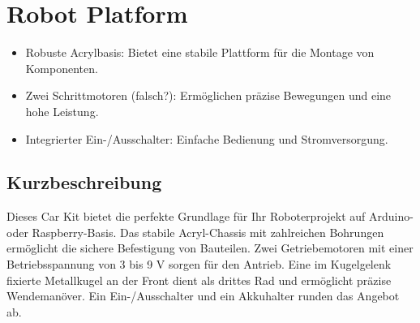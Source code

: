 %
%
%

\chapter{Robot Platform}









\begin{itemize}
    \item Robuste Acrylbasis: Bietet eine stabile Plattform für die Montage von Komponenten.
    \item Zwei Schrittmotoren (falsch?): Ermöglichen präzise Bewegungen und eine hohe Leistung.
    \item Integrierter Ein-/Ausschalter: Einfache Bedienung und Stromversorgung.
\end{itemize}


 \section{Kurzbeschreibung}
 
 Dieses Car Kit bietet die perfekte Grundlage für Ihr Roboterprojekt auf Arduino- oder Raspberry-Basis. Das stabile Acryl-Chassis mit zahlreichen Bohrungen ermöglicht die sichere Befestigung von Bauteilen. Zwei Getriebemotoren mit einer Betriebsspannung von 3 bis 9 V sorgen für den Antrieb. Eine im Kugelgelenk fixierte Metallkugel an der Front dient als drittes Rad und ermöglicht präzise Wendemanöver. Ein Ein-/Ausschalter und ein Akkuhalter runden das Angebot ab.
     
